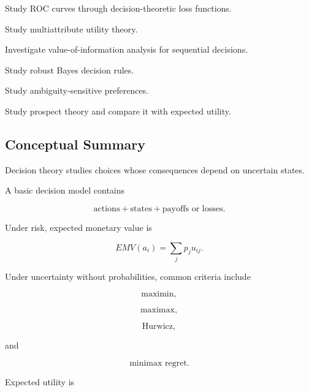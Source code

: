 \begin{exercise}[4]
Study ROC curves through decision-theoretic loss functions.
\end{exercise}

\begin{exercise}[4]
Study multiattribute utility theory.
\end{exercise}

\begin{exercise}[4]
Investigate value-of-information analysis for sequential decisions.
\end{exercise}

\begin{exercise}[4]
Study robust Bayes decision rules.
\end{exercise}

\begin{exercise}[4]
Study ambiguity-sensitive preferences.
\end{exercise}

\begin{exercise}[4]
Study prospect theory and compare it with expected utility.
\end{exercise}

\subsection{Conceptual Summary}
\label{subsec:decision-theory-summary}

Decision theory studies choices whose consequences depend on uncertain
states.

A basic decision model contains

\[
\boxed{
\text{actions}
+
\text{states}
+
\text{payoffs or losses}.
}
\]

Under risk, expected monetary value is

\[
\boxed{
EMV(a_i)
=
\sum_j
p_j
u_{ij}.
}
\]

Under uncertainty without probabilities, common criteria include

\[
\boxed{
\text{maximin},
}
\]

\[
\boxed{
\text{maximax},
}
\]

\[
\boxed{
\text{Hurwicz},
}
\]

and

\[
\boxed{
\text{minimax regret}.
}
\]

Expected utility is


